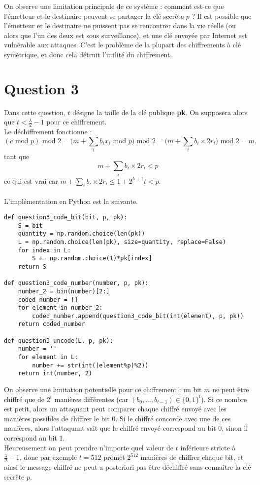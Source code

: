 \documentclass{article}
\begin{document}
On observe une limitation principale de ce système : comment est-ce que l'émetteur et le destinaire peuvent se partager la clé secrète $p$ ? Il est possible que l'émetteur et le destinaire ne puissent pas se rencontrer dans la vie réelle (ou alors que l'un des deux est sous surveillance), et une clé envoyée par Internet est vulnérable aux attaques. C'est le problème de la plupart des chiffrements à clé symétrique, et donc cela détruit l'utilité du chiffrement.

\section{Question 3}

\par Dans cette question, $t$ désigne la taille de la clé publique \textbf{pk}. On supposera alors que $t < \frac{\lambda}{2} - 1$ pour ce chiffrement.\\
Le déchiffrement fonctionne : 
$$(c \textrm{ mod } p) \textrm{ mod } 2 = \bigg( m + \displaystyle\sum_i b_ix_i \textrm{ mod } p \bigg) \textrm{ mod } 2 = \bigg( m + \displaystyle\sum_i b_i\times 2r_i \bigg) \textrm{ mod } 2 = m.$$
tant que $$ m + \displaystyle\sum_i b_i\times 2r_i < p$$
ce qui est vrai car  $m + \displaystyle\sum_i b_i\times 2r_i \leq 1 + 2^{\lambda+1}t < p$.
\\
\\

L'implémentation en Python est la suivante.

\begin{lstlisting}
def question3_code_bit(bit, p, pk):
    S = bit
    quantity = np.random.choice(len(pk))
    L = np.random.choice(len(pk), size=quantity, replace=False)
    for index in L:
        S += np.random.choice(1)*pk[index]
    return S

def question3_code_number(number, p, pk):
    number_2 = bin(number)[2:]
    coded_number = []
    for element in number_2:
        coded_number.append(question3_code_bit(int(element), p, pk))
    return coded_number

def question3_uncode(L, p, pk):
    number = ''
    for element in L:
        number += str(int((element%p)%2))
    return int(number, 2)
\end{lstlisting}

On observe une limitation potentielle pour ce chiffrement : un bit $m$ ne peut être chiffré que de $2^t$ manières différentes (car $(b_0,...,b_{t-1})\in \{0,1\}^t$). Si ce nombre est petit, alors un attaquant peut comparer chaque chiffré envoyé avec les manières possibles de chiffrer le bit $0$. Si le chiffré concorde avec une de ces manières, alors l'attaquant sait que le chiffré envoyé correspond au bit $0$, sinon il correspond au bit $1$.\\
Heureusement on peut prendre n'importe quel valeur de $t$ inférieure stricte à $\displaystyle \frac{\lambda}{2} - 1$, donc par exemple $t = 512$ promet $2^{512}$ manières de chiffrer chaque bit, et ainsi le message chiffré ne peut a posteriori pas être déchiffré sans connaître la clé secrète $p$.
\end{document}
